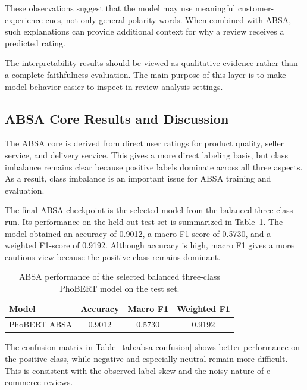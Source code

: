 \documentclass[a4paper,12pt]{extarticle}
\begin{document}
These observations suggest that the model may use meaningful customer-experience cues, not only general polarity words. When combined with ABSA, such explanations can provide additional context for why a review receives a predicted rating.

The interpretability results should be viewed as qualitative evidence rather than a complete faithfulness evaluation. The main purpose of this layer is to make model behavior easier to inspect in review-analysis settings.


\subsection{ABSA Core Results and Discussion}


The ABSA core is derived from direct user ratings for product quality, seller service, and delivery service. This gives a more direct labeling basis, but class imbalance remains clear because positive labels dominate across all three aspects. As a result, class imbalance is an important issue for ABSA training and evaluation.

The final ABSA checkpoint is the selected model from the balanced three-class run. Its performance on the held-out test set is summarized in Table~\ref{tab:absa-results}. The model obtained an accuracy of 0.9012, a macro F1-score of 0.5730, and a weighted F1-score of 0.9192. Although accuracy is high, macro F1 gives a more cautious view because the positive class remains dominant.


\begin{table}[ht]

\centering
\caption{ABSA performance of the selected balanced three-class PhoBERT model on the test set.}
\label{tab:absa-results}
\begin{tabular}{lccc}
\toprule
\textbf{Model} & \textbf{Accuracy} & \textbf{Macro F1} & \textbf{Weighted F1} \\
\midrule
PhoBERT ABSA & 0.9012 & 0.5730 & 0.9192 \\
\bottomrule
\end{tabular}

\end{table}


The confusion matrix in Table~\ref{tab:absa-confusion} shows better performance on the positive class, while negative and especially neutral remain more difficult. This is consistent with the observed label skew and the noisy nature of e-commerce reviews.
\end{document}
